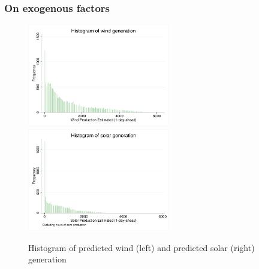 \begin{subappendices}
\subsubsection{On exogenous factors}
\label{statdesEXO}
\begin{figure}[H]
\begin{center}
\includegraphics[trim=0cm 0cm 0cm 0cm, clip=true, height=45mm]{figch2/m1b.pdf} 
\hspace{0.05cm}
\includegraphics[trim=0cm 0cm 0cm 0cm, clip=true, height=45mm]{figch2/m2b.pdf} 
\caption{Histogram of predicted wind (left) and predicted solar (right) generation}
\label{m1b}
\end{center}
\end{figure}

\end{subappendices}















